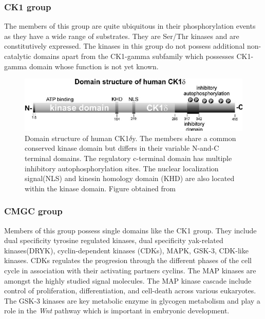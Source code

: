 \documentclass[a4paper, 11pt]{article}
\begin{document}
\subsubsection*{CK1 group}
The members of this group are quite ubiquitous in their phosphorylation events as they have a wide range of substrates. They are Ser/Thr kinases and are constitutively expressed. The kinases in this group do not possess additional non-catalytic domains apart from the CK1-gamma subfamily which possesses CK1-gamma domain whose function is not yet known.\\
\begin{figure}[H]
	\includegraphics[width=.8\linewidth]{figures/ck.jpg}
	\centering
	\caption{Domain structure of human CK1$\delta$y. The members share a common conserved kinase domain but differs in their variable N-and-C terminal domains. The regulatory c-terminal domain has multiple inhibitory autophosphorylation sites. The nuclear localization signal(NLS) and kinesin homology domain (KHD) are also located within the kinase domain. Figure obtained from \cite{knippschild2005role}}
	\label{camk_kinase}
\end{figure}
\subsubsection*{CMGC group}
Members of this group possess single domains like the CK1 group. They include dual specificity tyrosine regulated kinases, dual specificity yak-related kinases(DRYK), cyclin-dependent kinases (CDKs), MAPK, GSK-3, CDK-like kinases. CDKs regulates the progresion through the different phases of the cell cycle in association with their activating partners cyclins. The MAP kinases are amongst the highly studied signal molecules. The MAP kinase cascade include control of proliferation, differentiation, and cell-death across various eukaryotes. The GSK-3 kinases are key metabolic enzyme in glycogen metabolism and play a role in the \textit{Wnt} pathway which is important in embryonic development. \\
\end{document}
